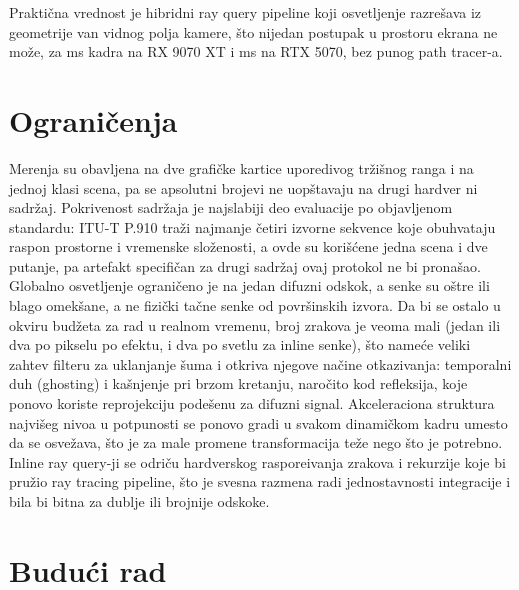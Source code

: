 Prakti\v{c}na vrednost je hibridni ray query pipeline koji osvetljenje razre\v{s}ava iz geometrije
van vidnog polja kamere, \v{s}to nijedan postupak u prostoru ekrana ne mo\v{z}e, za \perfFourEffectsAMD{}
ms kadra na RX 9070 XT i \perfFourEffectsNV{} ms na RTX 5070, bez punog path tracer-a.

\section{Ograni\v{c}enja}

Merenja su obavljena na dve grafi\v{c}ke kartice uporedivog tr\v{z}i\v{s}nog ranga i na jednoj klasi
scena, pa se apsolutni brojevi ne uop\v{s}tavaju na drugi hardver ni sadr\v{z}aj. Pokrivenost
sadr\v{z}aja je najslabiji deo evaluacije po objavljenom standardu: ITU-T P.910 \cite{itu_p910}
tra\v{z}i najmanje \v{c}etiri izvorne sekvence koje obuhvataju raspon prostorne i vremenske
slo\v{z}enosti, a ovde su kori\v{s}\'cene jedna scena i dve putanje, pa artefakt specifi\v{c}an za drugi
sadr\v{z}aj ovaj protokol ne bi prona\v{s}ao. Globalno osvetljenje ograni\v{c}eno je na jedan difuzni
odskok, a senke su o\v{s}tre ili blago omek\v{s}ane, a ne fizi\v{c}ki ta\v{c}ne senke od povr\v{s}inskih
izvora. Da bi se ostalo u okviru bud\v{z}eta za rad u realnom vremenu, broj zrakova je veoma mali (jedan
ili dva po pikselu po efektu, i dva po svetlu za inline senke), \v{s}to name\'ce veliki zahtev filteru
za uklanjanje \v{s}uma i otkriva njegove na\v{c}ine otkazivanja: temporalni duh (ghosting) i
ka\v{s}njenje pri brzom kretanju, naro\v{c}ito kod refleksija, koje ponovo koriste reprojekciju
pode\v{s}enu za difuzni signal. Akceleraciona struktura najvi\v{s}eg nivoa u potpunosti se
ponovo gradi u svakom dinami\v{c}kom kadru umesto da se osve\v{z}ava, \v{s}to je za male promene
transformacija te\v{z}e nego \v{s}to je potrebno. Inline ray query-ji se odri\v{c}u hardverskog
raspore\dj ivanja zrakova i rekurzije koje bi pru\v{z}io ray tracing pipeline, \v{s}to je svesna
razmena radi jednostavnosti integracije i bila bi bitna za dublje ili brojnije odskoke.

\section{Budu\'ci rad}

